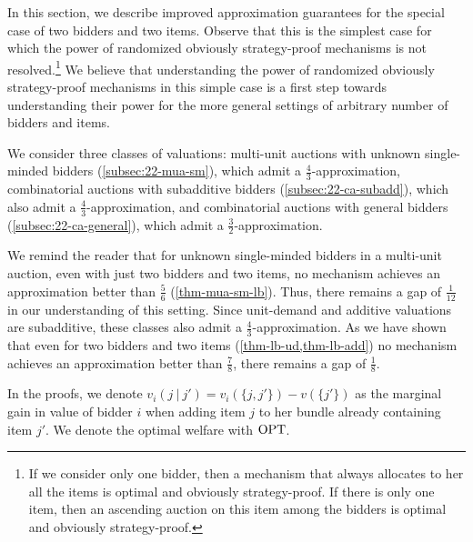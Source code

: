 In this section, we describe improved approximation guarantees for the special case of two bidders and two items. Observe that this is the simplest case for which the power of randomized obviously strategy-proof mechanisms is not resolved.\footnote{If we consider only one bidder, then a mechanism that always allocates to her all the items is optimal and obviously strategy-proof. If there is only one item, then an ascending auction on this item among the bidders is optimal and obviously strategy-proof.} We believe that understanding the power of randomized obviously strategy-proof mechanisms in this simple case is a first step towards understanding their power for the more general settings of arbitrary number of bidders and items. 

We consider three classes of valuations: multi-unit auctions with unknown single-minded bidders (\cref{subsec:22-mua-sm}), which admit a $\frac{4}{3}$-approximation, combinatorial auctions with subadditive bidders (\cref{subsec:22-ca-subadd}), which also admit a $\frac{4}{3}$-approximation, and combinatorial auctions with general bidders (\cref{subsec:22-ca-general}), which admit a $\frac{3}{2}$-approximation.

We remind the reader that for unknown single-minded bidders in a multi-unit auction, even with just two bidders and two items, no mechanism achieves an approximation better than $\frac{5}{6}$ (\cref{thm-mua-sm-lb}). Thus, there remains a gap of $\frac{1}{12}$ in our understanding of this setting.
Since unit-demand and additive valuations are subadditive, these classes also admit a $\frac{4}{3}$-approximation. As we have shown that even for two bidders and two items (\cref{thm-lb-ud,thm-lb-add}) no mechanism achieves an approximation better than $\frac{7}{8}$, there remains a gap of $\frac{1}{8}$.

In the proofs, we denote $v_i(j~|~j') = v_i(\{j,j'\}) - v(\{j'\})$ as the marginal gain in value of bidder $i$ when adding item $j$ to her bundle already containing item $j'$. We denote the optimal welfare with $\text{OPT}$. 

